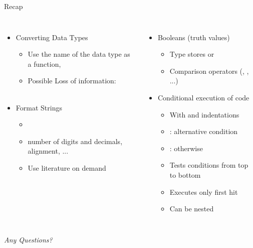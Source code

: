 
\begin{frame}{Recap}
%
\begin{columns}[T]
\begin{itemize}
\item Converting Data Types
	\begin{itemize}
	\item Use the name of the data type as a function, \zB {}
	\item Possible Loss of information: \\
		 ~\thus~ 
	\end{itemize}
\item Format Strings
	\begin{itemize}
	\item {}
	\item number of digits and decimals, alignment, ...
	\item Use literature on demand
	\end{itemize}
\end{itemize}
%
\begin{itemize}
\item Booleans (truth values)
	\begin{itemize}
	\item Type  stores  or 
	\item Comparison operators (\inPy{==}, \inPy{>=}, ...)
	\end{itemize}
\item Conditional execution of code
	\begin{itemize}
	\item With  and indentations
	\item {}: alternative condition
	\item {}: otherwise
	\item Tests conditions from top to bottom
	\item Executes only first hit
	\item Can be nested
	\end{itemize}
\end{itemize}
\end{columns}
%
\begin{center}
	\emph{Any Questions?}
\end{center}
%
\end{frame}

